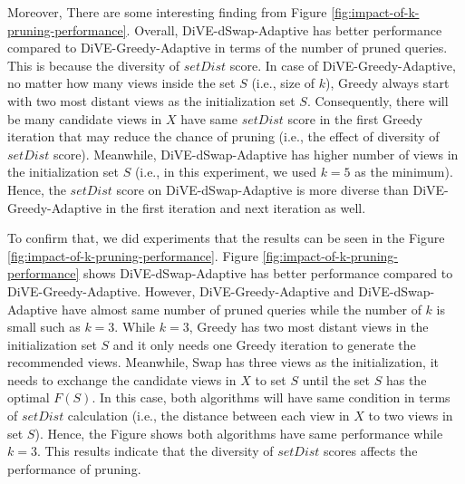 \documentclass{article}
\begin{document}
Moreover, There are some interesting finding from Figure \ref{fig:impact-of-k-pruning-performance}. Overall, DiVE-dSwap-Adaptive has better performance compared to DiVE-Greedy-Adaptive in terms of the number of pruned queries. This is because the diversity of $setDist$ score. In case of DiVE-Greedy-Adaptive, no matter how many views inside the set $S$ (i.e., size of $k$), Greedy always start with two most distant views as the initialization set $S$. Consequently, there will be many candidate views in $X$ have same $setDist$ score in the first Greedy iteration that may reduce the chance of pruning (i.e., the effect of diversity of $setDist$ score). Meanwhile,  DiVE-dSwap-Adaptive has higher number of views in the initialization set $S$ (i.e., in this experiment, we used $k = 5$ as the minimum). Hence, the $setDist$ score on DiVE-dSwap-Adaptive is more diverse than DiVE-Greedy-Adaptive in the first iteration and next iteration as well. 

To confirm that, we did experiments that the results can be seen in the Figure \ref{fig:impact-of-k-pruning-performance}. Figure \ref{fig:impact-of-k-pruning-performance} shows DiVE-dSwap-Adaptive has better performance compared to DiVE-Greedy-Adaptive. However, DiVE-Greedy-Adaptive and DiVE-dSwap-Adaptive have almost same number of pruned queries while the number of $k$ is small such as $k=3$. While $k=3$, Greedy has two most distant views in the initialization set $S$ and it only needs one Greedy iteration to generate the recommended views. Meanwhile, Swap has three views as the initialization, it needs to exchange the candidate views in $X$ to set $S$ until the set $S$ has the optimal $F(S)$. In this case, both algorithms will have same condition in terms of $setDist$ calculation (i.e., the distance between each view in $X$ to two views in set $S$). Hence, the Figure shows both algorithms have same performance while $k = 3$. This results indicate that the diversity of $setDist$ scores affects the performance of pruning. 



%
%
%
\end{document}
